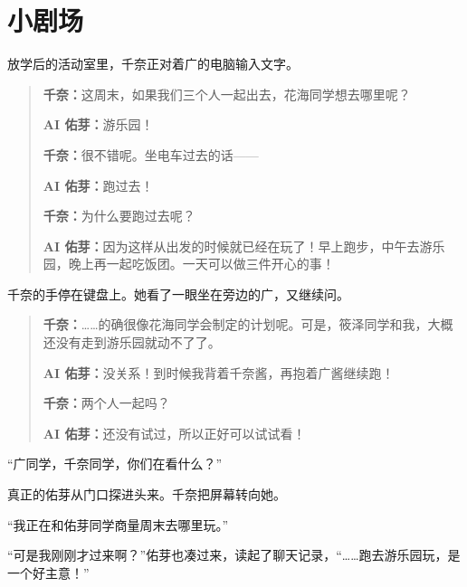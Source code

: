 


\section*{小剧场}
{}

放学后的活动室里，千奈正对着广的电脑输入文字。

\begin{quote}
\textbf{千奈：}这周末，如果我们三个人一起出去，花海同学想去哪里呢？

\textbf{AI 佑芽：}游乐园！

\textbf{千奈：}很不错呢。坐电车过去的话——

\textbf{AI 佑芽：}跑过去！

\textbf{千奈：}为什么要跑过去呢？

\textbf{AI 佑芽：}因为这样从出发的时候就已经在玩了！早上跑步，中午去游乐园，晚上再一起吃饭团。一天可以做三件开心的事！
\end{quote}

千奈的手停在键盘上。她看了一眼坐在旁边的广，又继续问。

\begin{quote}
\textbf{千奈：}……的确很像花海同学会制定的计划呢。可是，筱泽同学和我，大概还没有走到游乐园就动不了了。

\textbf{AI 佑芽：}没关系！到时候我背着千奈酱，再抱着广酱继续跑！

\textbf{千奈：}两个人一起吗？

\textbf{AI 佑芽：}还没有试过，所以正好可以试试看！
\end{quote}

“广同学，千奈同学，你们在看什么？”

真正的佑芽从门口探进头来。千奈把屏幕转向她。

“我正在和佑芽同学商量周末去哪里玩。”

“可是我刚刚才过来啊？”佑芽也凑过来，读起了聊天记录，“……跑去游乐园玩，是一个好主意！”

